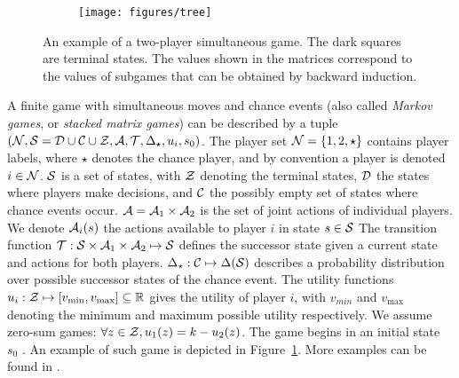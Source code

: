 \begin{figure}[t!]
\centering
\begin{subfigure}{12cm}
\centering
\texttt{[image: figures/tree]}\\
\end{subfigure}%
\caption{An example of a two-player simultaneous game. %
The dark squares are terminal states. The values shown in the matrices correspond to the values of subgames that can be obtained by backward induction.\\
\label{fig:example}}
\end{figure}

A finite game with simultaneous moves and chance events (also called \emph{Markov games}, or \emph{stacked matrix games}) can be described
by a tuple $(\mathcal{N}, \mathcal{S} = \mathcal{D}\cup\mathcal{C}\cup\mathcal{Z}, \mathcal{A}, \mathcal{T}, \Delta_\star, u_i, s_0)$.
The player set $\mathcal{N} = \{ 1, 2, \star \}$ contains player labels, where
$\star$ denotes the chance player, and by convention a player is denoted $i \in \mathcal{N}$.
$\mathcal{S}$ is a set of states, with $\mathcal{Z}$ denoting the terminal states, $\mathcal{D}$ the states where players make decisions,
and $\mathcal{C}$ the possibly empty set of states where chance events occur. $\mathcal{A} = \mathcal{A}_1 \times \mathcal{A}_2$ is the set of
joint actions of individual players. We denote $\mathcal{A}_i(s)$ the actions available to player $i$ in state $s \in \mathcal{S}$ 
The transition function $\mathcal{T} : \mathcal{S} \times \mathcal{A}_1 \times \mathcal{A}_2 \mapsto \mathcal{S}$ defines the successor state given a current
state and actions for both players. $\Delta_\star:\mathcal{C} \mapsto \Delta(\mathcal{S})$ describes a probability distribution over
possible successor states of the chance event.
The utility functions $u_i : \mathcal{Z} \mapsto [v_{\min}, v_{\max}] \subseteq \mathbb{R}$ gives the utility of player $i$, with
$v_{min}$ and $v_{\max}$ denoting the minimum and maximum possible utility respectively. We assume zero-sum
games: $\forall z \in \mathcal{Z}, u_1(z) = k - u_2(z)$.
The game begins in an initial state $s_0$ .
An example of such game is depicted in Figure~\ref{fig:example}. More examples can be found in \cite[Chapter 5]{Saffidine2013thesis}.

